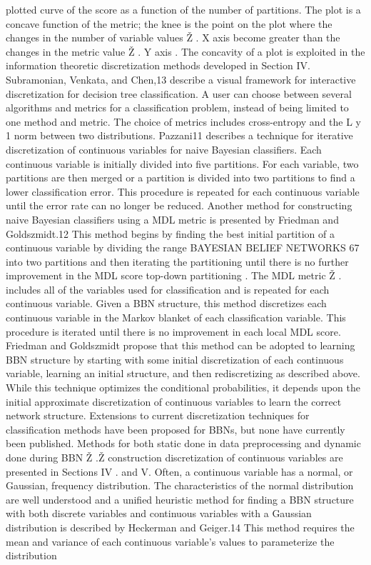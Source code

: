 plotted curve of the score as a function of the number of partitions. The plot is a
concave function of the metric; the knee is the point on the plot where the
changes in the number of variable values Ž . X axis become greater than
the changes in the metric value Ž . Y axis . The concavity of a plot is exploited in
the information theoretic discretization methods developed in Section IV.
Subramonian, Venkata, and Chen,13 describe a visual framework for interactive
discretization for decision tree classification. A user can choose between
several algorithms and metrics for a classification problem, instead of being
limited to one method and metric. The choice of metrics includes cross-entropy
and the L y 1 norm between two distributions.
Pazzani11 describes a technique for iterative discretization of continuous
variables for naive Bayesian classifiers. Each continuous variable is initially
divided into five partitions. For each variable, two partitions are then merged or
a partition is divided into two partitions to find a lower classification error. This
procedure is repeated for each continuous variable until the error rate can no
longer be reduced.
Another method for constructing naive Bayesian classifiers using a MDL
metric is presented by Friedman and Goldszmidt.12 This method begins by
finding the best initial partition of a continuous variable by dividing the range
BAYESIAN BELIEF NETWORKS 67
into two partitions and then iterating the partitioning until there is no further
improvement in the MDL score top-down partitioning . The MDL metric Ž .
includes all of the variables used for classification and is repeated for each
continuous variable. Given a BBN structure, this method discretizes each
continuous variable in the Markov blanket of each classification variable. This
procedure is iterated until there is no improvement in each local MDL score.
Friedman and Goldszmidt propose that this method can be adopted to
learning BBN structure by starting with some initial discretization of each
continuous variable, learning an initial structure, and then rediscretizing as
described above. While this technique optimizes the conditional probabilities, it
depends upon the initial approximate discretization of continuous variables to
learn the correct network structure.
Extensions to current discretization techniques for classification methods
have been proposed for BBNs, but none have currently been published. Methods
for both static done in data preprocessing and dynamic done during BBN Ž .Ž
construction discretization of continuous variables are presented in Sections IV .
and V.
Often, a continuous variable has a normal, or Gaussian, frequency distribution.
The characteristics of the normal distribution are well understood and a
unified heuristic method for finding a BBN structure with both discrete variables
and continuous variables with a Gaussian distribution is described by Heckerman
and Geiger.14 This method requires the mean and variance of each
continuous variable’s values to parameterize the distribution